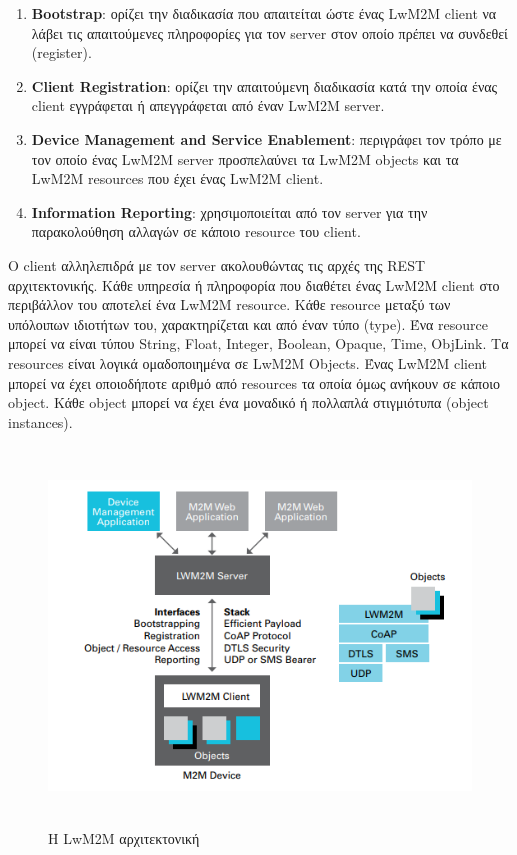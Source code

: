 \begin{enumerate}
	\item{\textbf{Bootstrap}: ορίζει την διαδικασία που απαιτείται ώστε ένας LwM2M client να λάβει τις απαιτούμενες πληροφορίες για τον server στον οποίο πρέπει να συνδεθεί (register).}
	\item{\textbf{Client Registration}: ορίζει την απαιτούμενη διαδικασία κατά την οποία ένας client εγγράφεται ή απεγγράφεται από έναν LwM2M server.}
	\item{\textbf{Device Management and Service Enablement}:  περιγράφει τον τρόπο με τον οποίο ένας LwM2M server προσπελαύνει τα LwM2M objects και τα LwM2M resources που έχει ένας LwM2M client.}
	\item{\textbf{Information Reporting}: χρησιμοποιείται από τον server για την παρακολούθηση αλλαγών σε κάποιο resource του client.}
\end{enumerate}

Ο client αλληλεπιδρά με τον server ακολουθώντας τις αρχές της REST αρχιτεκτονικής. Κάθε υπηρεσία ή πληροφορία που διαθέτει ένας LwM2M client στο περιβάλλον του αποτελεί ένα LwM2M resource. Κάθε resource μεταξύ των υπόλοιπων ιδιοτήτων του, χαρακτηρίζεται και από έναν τύπο (type). Ένα resource μπορεί να είναι τύπου {String, Float, Integer, Boolean, Opaque, Time, ObjLink}. Τα resources είναι λογικά ομαδοποιημένα σε LwM2M Objects. Ένας LwM2M client μπορεί να έχει οποιοδήποτε αριθμό από resources τα οποία όμως ανήκουν σε κάποιο object. Κάθε object μπορεί να έχει ένα μοναδικό ή πολλαπλά στιγμιότυπα (object instances).


\begin{figure}[htbp]
	\centering
		\includegraphics[height=10cm,width=15cm]{Figures/5.png}
	\caption{Η LwM2M αρχιτεκτονική \cite{OMA1} }	
\end{figure}

